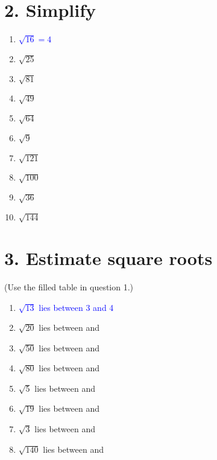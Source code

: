 \documentclass{hw}
\begin{document}
\section*{\normalsize 2. Simplify}
\begin{enumerate}[label=\alph*.]
    \item \textcolor{blue}{$\sqrt{16} = 4$}
        \studentworkspace
    \item $\sqrt{25}$
        \studentworkspace
    \item $\sqrt{81}$
        \studentworkspace
    \item $\sqrt{49}$
        \studentworkspace
    \item $\sqrt{64}$
        \studentworkspace
    \item $\sqrt{9}$
        \studentworkspace
    \item $\sqrt{121}$
        \studentworkspace
    \item $\sqrt{100}$
        \studentworkspace
    \item $\sqrt{36}$
        \studentworkspace
    \item $\sqrt{144}$
        \studentworkspace
\end{enumerate}

\section*{\normalsize 3. Estimate square roots}
(Use the filled table in question 1.)
\begin{enumerate}[label=\alph*.]
    \item \textcolor{blue}{$\sqrt{13}$ lies between 3 and 4}
        \studentsmallworkspace
    \item $\sqrt{20}$ lies between \blankline{3em} and \blankline{3em}
        \studentsmallworkspace
    \item $\sqrt{50}$ lies between \blankline{3em} and \blankline{3em}
        \studentsmallworkspace
    \item $\sqrt{80}$ lies between \blankline{3em} and \blankline{3em}
        \studentsmallworkspace
    \item $\sqrt{5}$ lies between \blankline{3em} and \blankline{3em}
        \studentsmallworkspace
    \item $\sqrt{19}$ lies between \blankline{3em} and \blankline{3em}
        \studentsmallworkspace
    \item $\sqrt{3}$ lies between \blankline{3em} and \blankline{3em}
        \studentsmallworkspace
    \item $\sqrt{140}$ lies between \blankline{3em} and \blankline{3em}
        \studentsmallworkspace
\end{enumerate}
\end{document}
